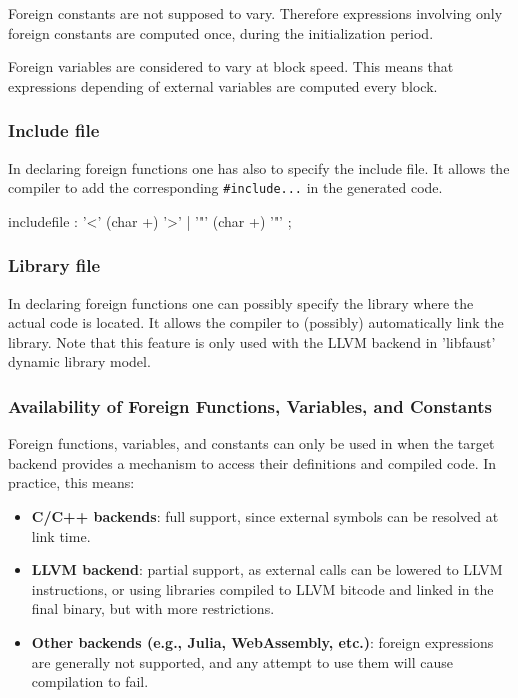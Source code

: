 Foreign constants are not supposed to vary. Therefore expressions involving only foreign constants are computed once, during the initialization period. 

Foreign variables are considered to vary at block speed. This means that expressions depending of external variables are computed every block.

\subsubsection{Include file}
In declaring foreign functions one has also to specify the include file. It allows the \faust compiler to add the corresponding \lstinline'#include...' in the generated code.

\begin{rail}
includefile : '<' (char +) '>' | '"' (char +) '"' ;
\end{rail}

\subsubsection{Library file}
In declaring foreign functions one can possibly specify the library where the actual code is located. It allows the \faust compiler to (possibly) automatically link the library. Note that this feature is only used with the LLVM backend in 'libfaust' dynamic library model.


\subsubsection{Availability of Foreign Functions, Variables, and Constants}

Foreign functions, variables, and constants can only be used in \faust when the target backend provides a mechanism to access their definitions and compiled code. In practice, this means:  

\begin{itemize}
  \item \textbf{C/C++ backends}: full support, since external symbols can be resolved at link time.
  \item \textbf{LLVM backend}: partial support, as external calls can be lowered to LLVM instructions, or using libraries compiled to LLVM bitcode and linked in the final binary, but with more restrictions.
  \item \textbf{Other backends (e.g., Julia, WebAssembly, etc.)}: foreign expressions are generally not supported, and any attempt to use them will cause compilation to fail.
\end{itemize}

